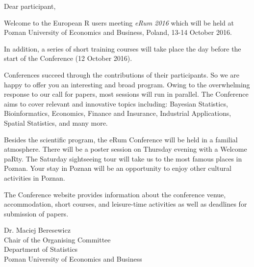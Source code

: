 \Large
\raggedright Dear participant,

Welcome to the European R users meeting \textit{eRum 2016} which will be held at Poznan University of Economics and Business, Poland, 13-14 October 2016.

In addition, a series of short training courses will take place the day before the start of the Conference (12 October 2016).

Conferences succeed through the contributions of their participants. So we are happy to offer you an interesting and broad program. Owing to the overwhelming response to our call for papers, most sessions will run in parallel. The Conference aims to cover relevant and innovative topics including: Bayesian Statistics, Bioinformatics, Economics, Finance and Insurance, Industrial Applications, Spatial Statistics, and many more.

Besides the scientific program, the eRum Conference will be held in a familial atmosphere. There will be a poster session on Thursday evening with a Welcome paRty. The Saturday sightseeing tour will take us to the most famous places in Poznan. Your stay in Poznan will be an opportunity to enjoy other cultural activities in Poznan.

The Conference website provides information about the conference venue, accommodation, short courses, and leisure-time activities as well as deadlines for submission of papers.

\vspace{1.5cm}

\begin{flushleft}
Dr. Maciej Beresewicz \\
\vspace{0.5cm}
Chair of the Organising Committee \\ 
Department of Statistics \\ 
Poznan University of Economics and Business
\end{flushleft}
